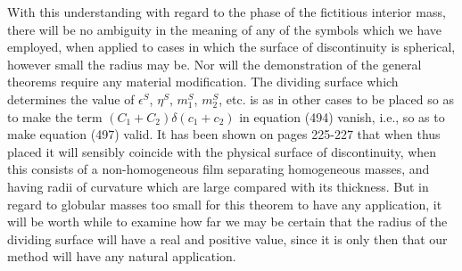 \documentclass[12pt]{memoir}
\newcommand{\dd}{\delta}
\begin{document}
{With this understanding with regard to the phase of the fictitious interior mass, there will be no ambiguity in the meaning of any of the symbols which we have employed, when applied to cases in which the surface of discontinuity is spherical, however small the radius may be. Nor will the demonstration of the general theorems require any material modification. The dividing surface which determines the value of $\epsilon^S$, $\eta^S$, $m_1^S$, $m_2^S$, etc. is as in other cases to be placed so as to make the term $(C_1 + C_2) \dd (c_1 + c_2)$ in equation (494) vanish, i.e., so as to make equation (497) valid. It has been shown on pages 225-227 that when thus placed it will sensibly coincide with the physical surface of discontinuity, when this consists of a non-homogeneous film separating homogeneous masses, and having radii of curvature which are large compared with its thickness. But in regard to globular masses too small for this theorem to have any application, it will be worth while to examine how far we may be certain that the radius of the dividing surface will have a real and positive value, since it is only then that our method will have any natural application.

}
\end{document}
